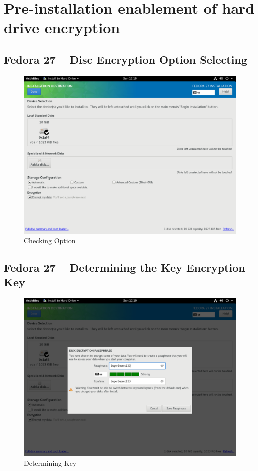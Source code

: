 \chapter{Pre-installation enablement of hard drive encryption}
\label{luksinstall}

\section{Fedora 27 -- Disc Encryption Option Selecting}

\begin{figure}[H]
    \centering
    \includegraphics[scale=0.55]{figures/FedoraInstall1.pdf}
    \caption{Checking Option}
\end{figure}

\newpage

\section{Fedora 27 -- Determining the Key Encryption Key}

\begin{figure}[H]
    \centering
    \includegraphics[scale=0.55]{figures/FedoraInstall2.pdf}
    \caption{Determining Key}
\end{figure}
